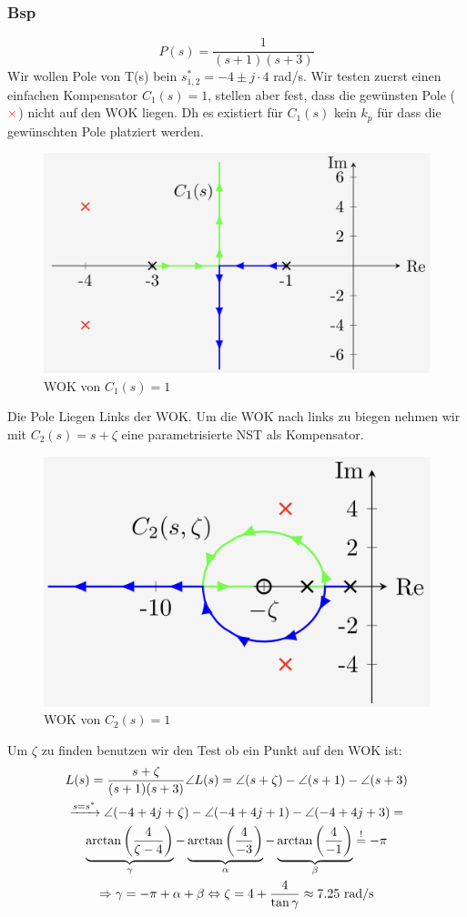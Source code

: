     \subsubsection{Bsp}
        \begin{equation*}
            P(s) = \frac{1}{(s+1)(s+3)}
        \end{equation*}
        Wir wollen Pole von T(s) bein $s^*_{1,2} = -4 \pm j\cdot4$ rad/s. Wir testen zuerst einen einfachen Kompensator $C_1(s) = 1$, stellen aber fest, dass die gewünsten Pole (\Large$\textcolor{red}{\times}$\normalsize)  nicht auf den WOK liegen. Dh es existiert für $C_1(s)$ kein $k_p$ für dass die gewünschten Pole platziert werden.
        
        \begin{figure}[H]
            \centering
            \includegraphics[width = 0.5\linewidth]{images/04/RL_kom_bsp1.jpeg}
            \caption{WOK von $C_1(s)=1$}
        \end{figure}
        
        Die Pole Liegen Links der WOK. Um die WOK nach links zu biegen nehmen wir mit $C_2(s) = s + \zeta$ eine parametrisierte NST als Kompensator.
        
        \begin{figure}[H]
            \centering
            \includegraphics[width = 0.5\linewidth]{images/04/RL_kom_bsp2.jpeg}
            \caption{WOK von $C_2(s)=1$}
        \end{figure}
        
        Um $\zeta$ zu finden benutzen wir den Test ob ein Punkt auf den WOK ist:
        \begin{gather*}
            L(s) = \frac{s+\zeta}{(s+1)(s+3)} \angle L(s) = \angle(s+\zeta) -\angle(s+1)-\angle(s+3)\\
            \xrightarrow{s = s^*}  \angle(-4+4j+\zeta) -\angle(-4+4j+1)-\angle(-4+4j+3) = \\
            \underbrace{\arctan\left(\frac{4}{\zeta-4}\right)}_\gamma-\underbrace{\arctan\left(\frac{4}{-3}\right)}_\alpha - \underbrace{\arctan\left(\frac{4}{-1}\right)}_\beta \overset{!}{=} -\pi\\
            \Rightarrow \gamma = -\pi+\alpha+\beta \Leftrightarrow \zeta = 4 + \frac{4}{\tan\gamma} \approx 7.25\textnormal{ rad/s}
        \end{gather*}